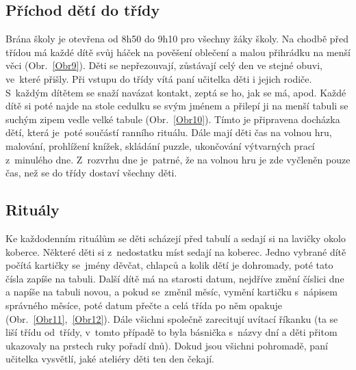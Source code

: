 		\subsection{Příchod dětí do třídy}
		\label{prichod}
			Brána školy je otevřena od 8h50 do 9h10 pro všechny žáky školy. Na chodbě před třídou má každé dítě svůj háček na pověšení oblečení a malou přihrádku na menší věci (Obr.~\ref{Obr9}). Děti se nepřezouvají, zůstávají celý den ve stejné obuvi, ve které přišly. Při vstupu do třídy vítá paní učitelka děti i jejich rodiče. S každým dítětem se snaží navázat kontakt, zeptá se ho, jak se má, apod. Každé dítě si poté najde na stole cedulku se svým jménem a přilepí ji na menší tabuli se suchým zipem vedle velké tabule (Obr.~\ref{Obr10}). Tímto je připravena docházka dětí, která je poté součástí ranního rituálu. Dále mají děti čas na volnou hru, malování, prohlížení knížek, skládání puzzle, ukončování výtvarných prací z minulého dne. Z rozvrhu dne je patrné, že na volnou hru je zde vyčleněn pouze čas, než se do třídy dostaví všechny děti. 
		

		\subsection{Rituály}
		\label{ritualy}
			Ke každodenním rituálům se děti scházejí před tabulí a sedají si na lavičky okolo koberce. Některé děti si z nedostatku míst sedají na koberec. Jedno vybrané dítě počítá kartičky se jmény děvčat, chlapců a kolik dětí je dohromady, poté tato čísla zapíše na tabuli. Další dítě má na starosti datum, nejdříve změní číslici dne a napíše na tabuli novou, a pokud se změnil měsíc, vymění kartičku s nápisem správného měsíce, poté datum přečte a celá třída po něm opakuje (Obr.~\ref{Obr11},~\ref{Obr12}). Dále všichni společně zarecitují uvítací říkanku (ta se liší třídu od třídy, v tomto případě to byla básnička s názvy dní a děti přitom ukazovaly na prstech ruky pořadí dnů). Dokud jsou všichni pohromadě, paní učitelka vysvětlí, jaké ateliéry děti ten den čekají. 
		


